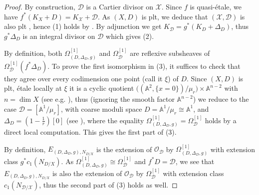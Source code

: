 \documentclass[12pt]{amsart}
\theoremstyle{definition}
\newcommand{\bA}{\mathbb{A}}
\newcommand{\cX}{\mathcal{X}}
\newcommand{\cO}{\mathcal{O}}
\newcommand{\cD}{\mathcal{D}}
\numberwithin{equation}{section}
\begin{document}
\begin{proof}
By construction, $\cD$ is a Cartier divisor on $\cX$. Since $f$ is quasi-\'etale, we have $f^*(K_X+D)=K_{\cX}+\cD$. As $(X,D)$ is plt, we deduce that $(\cX,\cD)$ is also plt \cite[Proposition 5.20]{KM98}, hence (1) holds by \cite[Proposition 5.51]{KM98}. By adjunction we get $K_{\cD} = g^*(K_D+\Delta_D)$, thus $g^*\Delta_D$ is an integral divisor on $\cD$ which gives (2).

By definition, both $\Omega^{[1]}_{(D,\Delta_D,g)}$ and $\Omega^{[1]}_{\cD}$ are reflexive subsheaves of $\Omega^{[1]}_{\cD}(f^*\Delta_D)$. To prove the first isomorphism in (3), it suffices to check that they agree over every codimension one point (call it $\xi$) of $D$. Since $(X,D)$ is plt, \'etale locally at $\xi$ it is a cyclic quotient $\big((\bA^2,\{x=0\})/\mu_r\big)\times \bA^{n-2}$ with $n=\dim X$ (see e.g. \cite[Section 3.3]{Kol13}), thus (ignoring the smooth factor $\bA^{n-2}$) we reduce to the case $\cD=[\bA^1/\mu_r]$, with coarse moduli space $D=\bA^1/\mu_r\cong \bA^1$, and $\Delta_D = (1-\frac{1}{r})[0]$ (see \cite[Theorem 3.36]{Kol13}), where the equality $\Omega^{[1]}_{(D,\Delta_D,g)}=\Omega^{[1]}_{\cD}$ holds by a direct local computation. This gives the first part of (3).

By definition, $E_{(D,\Delta_D,g),N_{D/X}}$ is the extension of $\cO_{\cD}$ by $\Omega^{[1]}_{(D,\Delta_D,g)}$ with extension class $g^*c_1(N_{D/X})$. As $\Omega^{[1]}_{(D,\Delta_D,g)} \cong \Omega^{[1]}_{\cD}$ and $f^*D = \cD$, we see that $E_{(D,\Delta_D,g),N_{D/X}}$ is also the extension of $\cO_{\cD}$ by $\Omega^{[1]}_{\cD}$ with extension class $c_1(N_{\cD/\cX})$, thus the second part of (3) holds as well.
\end{proof}

\end{document}
